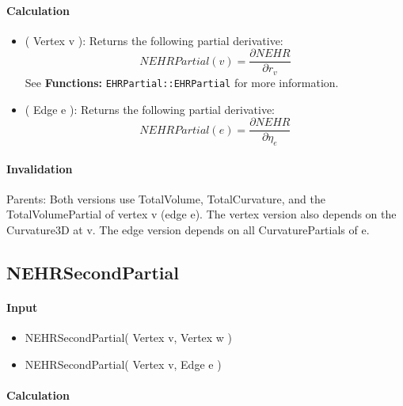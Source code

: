 \paragraph{Calculation}

\begin{itemize}
\item ( Vertex v ): Returns the following partial derivative: 
\begin{equation*}
NEHRPartial(v)=\frac{\partial NEHR}{\partial r_{v}}
\end{equation*}%
See \textbf{Functions: }\texttt{EHRPartial::EHRPartial} for more information.

\item ( Edge e ): Returns the following partial derivative: 
\begin{equation*}
NEHRPartial(e)=\frac{\partial NEHR}{\partial \eta _{e}}
\end{equation*}
\end{itemize}

\paragraph{Invalidation}

Parents: Both versions use TotalVolume, TotalCurvature, and the
TotalVolumePartial of vertex v (edge e). The vertex version also depends on
the Curvature3D at v. The edge version depends on all CurvaturePartials of e.

\bigskip

\subsection{NEHRSecondPartial}

\paragraph{Input}

\begin{itemize}
\item NEHRSecondPartial( Vertex v, Vertex w )

\item NEHRSecondPartial( Vertex v, Edge e )
\end{itemize}

\paragraph{Calculation}

